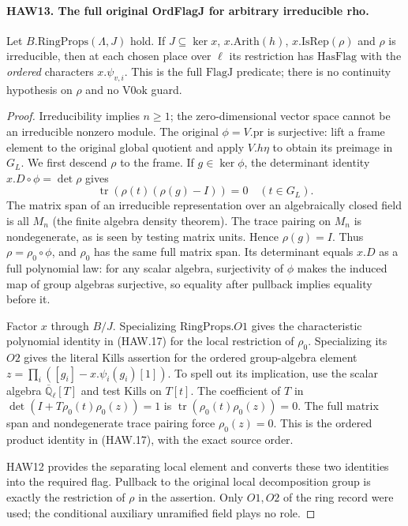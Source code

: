 \paragraph{HAW13. The full original OrdFlagJ for arbitrary irreducible rho.}
\label{claim:HAW13}
Let $B.\mathrm{RingProps}(\Lambda,J)$ hold.  If
$J\subseteq\ker x$, $x.\mathrm{Arith}(h)$,
$x.\mathrm{IsRep}(\rho)$ and $\rho$ is irreducible, then
at each chosen place over $\ell$ its restriction has
$\mathrm{HasFlag}$ with the \emph{ordered} characters
$x.\psi_{v,i}$.  This is the full $\mathrm{FlagJ}$ predicate;
there is no continuity hypothesis on $\rho$ and no
$\mathrm{V0ok}$ guard.
\begin{proof}
Irreducibility implies $n\ge1$; the zero-dimensional vector
space cannot be an irreducible nonzero module.  The original
$\phi=V.\mathrm{pr}$ is surjective: lift a frame element to
the original global quotient and apply $V.h\eta$ to obtain
its preimage in $G_L$.
We first descend $\rho$ to the frame.  If $g\in\ker\phi$,
the determinant identity $x.D\circ\phi=\det\rho$ gives
\[
          \operatorname{tr}(\rho(t)(\rho(g)-I))=0
                                           \quad(t\in G_L).
\]
The matrix span of an irreducible representation over an
algebraically closed field is all $M_n$ (the finite algebra
density theorem).  The trace pairing on $M_n$ is
nondegenerate, as is seen by testing matrix units.  Hence
$\rho(g)=I$.  Thus $\rho=\rho_0\circ\phi$, and $\rho_0$
has the same full matrix span.  Its determinant equals
$x.D$ as a full polynomial law: for any scalar algebra,
surjectivity of $\phi$ makes the induced map of group
algebras surjective, so equality after pullback implies
equality before it.

Factor $x$ through $B/J$.  Specializing $\mathrm{RingProps}.O1$
gives the characteristic polynomial identity in (HAW.17)
for the local restriction of $\rho_0$.  Specializing its
$O2$ gives the literal $\mathrm{Kills}$ assertion for the
ordered group-algebra element
$z=\prod_i([g_i]-x.\psi_i(g_i)[1])$.
To spell out its implication, use the scalar algebra
$\overline{\mathbb Q}_\ell[T]$ and test $\mathrm{Kills}$
on $T[t]$.  The coefficient of $T$ in
$\det(I+T\rho_0(t)\rho_0(z))=1$ is
$\operatorname{tr}(\rho_0(t)\rho_0(z))=0$.
The full matrix span and nondegenerate trace pairing force
$\rho_0(z)=0$.  This is the ordered product identity in
(HAW.17), with the exact source order.

HAW12 provides the separating local element and converts
these two identities into the required flag.  Pullback to
the original local decomposition group is exactly the
restriction of $\rho$ in the assertion.  Only $O1,O2$ of
the ring record were used; the conditional auxiliary
unramified field plays no role.
\end{proof}

